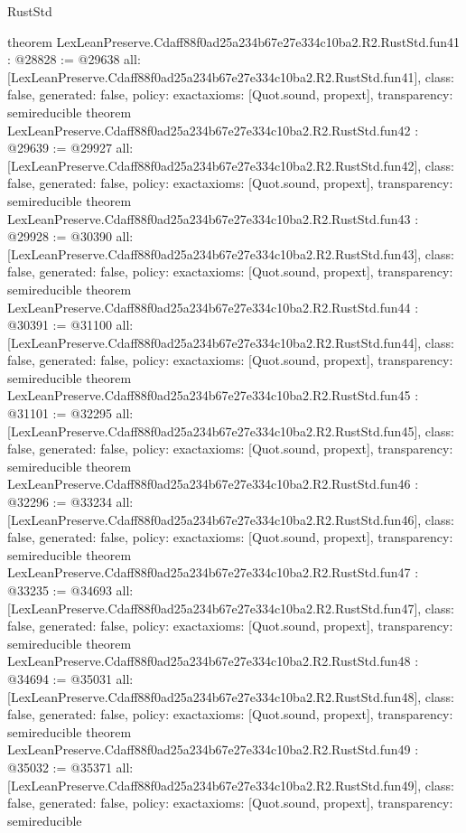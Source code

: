 \begin{lexlean}{RustStd}
\begin{coremodule}
{}
theorem LexLeanPreserve.Cdaff88f0ad25a234b67e27e334c10ba2.R2.RustStd.fun41 : @28828 := @29638 {
  all: [LexLeanPreserve.Cdaff88f0ad25a234b67e27e334c10ba2.R2.RustStd.fun41],
  class: false,
  generated: false,
  policy: exact{axioms: [Quot.sound, propext]},
  transparency: semireducible
}
theorem LexLeanPreserve.Cdaff88f0ad25a234b67e27e334c10ba2.R2.RustStd.fun42 : @29639 := @29927 {
  all: [LexLeanPreserve.Cdaff88f0ad25a234b67e27e334c10ba2.R2.RustStd.fun42],
  class: false,
  generated: false,
  policy: exact{axioms: [Quot.sound, propext]},
  transparency: semireducible
}
theorem LexLeanPreserve.Cdaff88f0ad25a234b67e27e334c10ba2.R2.RustStd.fun43 : @29928 := @30390 {
  all: [LexLeanPreserve.Cdaff88f0ad25a234b67e27e334c10ba2.R2.RustStd.fun43],
  class: false,
  generated: false,
  policy: exact{axioms: [Quot.sound, propext]},
  transparency: semireducible
}
theorem LexLeanPreserve.Cdaff88f0ad25a234b67e27e334c10ba2.R2.RustStd.fun44 : @30391 := @31100 {
  all: [LexLeanPreserve.Cdaff88f0ad25a234b67e27e334c10ba2.R2.RustStd.fun44],
  class: false,
  generated: false,
  policy: exact{axioms: [Quot.sound, propext]},
  transparency: semireducible
}
theorem LexLeanPreserve.Cdaff88f0ad25a234b67e27e334c10ba2.R2.RustStd.fun45 : @31101 := @32295 {
  all: [LexLeanPreserve.Cdaff88f0ad25a234b67e27e334c10ba2.R2.RustStd.fun45],
  class: false,
  generated: false,
  policy: exact{axioms: [Quot.sound, propext]},
  transparency: semireducible
}
theorem LexLeanPreserve.Cdaff88f0ad25a234b67e27e334c10ba2.R2.RustStd.fun46 : @32296 := @33234 {
  all: [LexLeanPreserve.Cdaff88f0ad25a234b67e27e334c10ba2.R2.RustStd.fun46],
  class: false,
  generated: false,
  policy: exact{axioms: [Quot.sound, propext]},
  transparency: semireducible
}
theorem LexLeanPreserve.Cdaff88f0ad25a234b67e27e334c10ba2.R2.RustStd.fun47 : @33235 := @34693 {
  all: [LexLeanPreserve.Cdaff88f0ad25a234b67e27e334c10ba2.R2.RustStd.fun47],
  class: false,
  generated: false,
  policy: exact{axioms: [Quot.sound, propext]},
  transparency: semireducible
}
theorem LexLeanPreserve.Cdaff88f0ad25a234b67e27e334c10ba2.R2.RustStd.fun48 : @34694 := @35031 {
  all: [LexLeanPreserve.Cdaff88f0ad25a234b67e27e334c10ba2.R2.RustStd.fun48],
  class: false,
  generated: false,
  policy: exact{axioms: [Quot.sound, propext]},
  transparency: semireducible
}
theorem LexLeanPreserve.Cdaff88f0ad25a234b67e27e334c10ba2.R2.RustStd.fun49 : @35032 := @35371 {
  all: [LexLeanPreserve.Cdaff88f0ad25a234b67e27e334c10ba2.R2.RustStd.fun49],
  class: false,
  generated: false,
  policy: exact{axioms: [Quot.sound, propext]},
  transparency: semireducible
}
\end{coremodule}
\end{lexlean}
